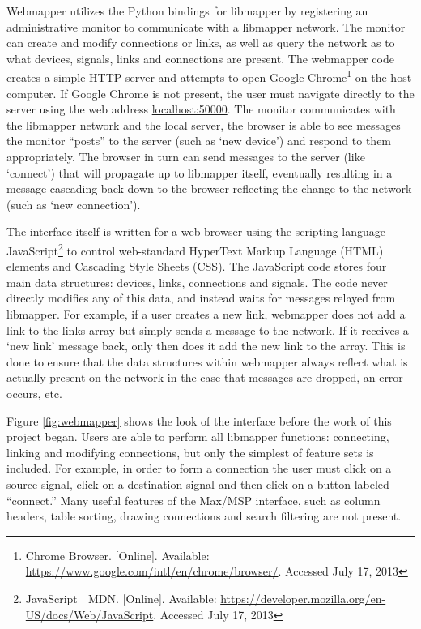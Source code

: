 Webmapper utilizes the Python bindings for libmapper by registering an administrative monitor to communicate with a libmapper network. The monitor can create and modify connections or links, as well as query the network as to what devices, signals, links and connections are present. The webmapper code creates a simple HTTP server and attempts to open Google Chrome\footnote{Chrome Browser. [Online]. Available: \url{https://www.google.com/intl/en/chrome/browser/}. Accessed July 17, 2013} on the host computer. If Google Chrome is not present, the user must navigate directly to the server using the web address \url{localhost:50000}. The monitor communicates with the libmapper network and the local server, the browser is able to see messages the monitor ``posts'' to the server (such as `new device') and respond to them appropriately. The browser in turn can send messages to the server (like `connect') that will propagate up to libmapper itself, eventually resulting in a message cascading back down to the browser reflecting the change to the network (such as `new connection'). 

The interface itself is written for a web browser using the scripting language JavaScript\footnote{JavaScript | MDN. [Online]. Available: \url{https://developer.mozilla.org/en-US/docs/Web/JavaScript}. Accessed July 17, 2013} to control web-standard HyperText Markup Language (HTML) elements and Cascading Style Sheets (CSS). The JavaScript code stores four main data structures: devices, links, connections and signals. The code never directly modifies any of this data, and instead waits for messages relayed from libmapper. For example, if a user creates a new link, webmapper does not add a link to the links array but simply sends a message to the network. If it receives a `new link' message back, only then does it add the new link to the array. This is done to ensure that the data structures within webmapper always reflect what is actually present on the network in the case that messages are dropped, an error occurs, etc.

Figure \ref{fig:webmapper} shows the look of the interface before the work of this project began. Users are able to perform all libmapper functions: connecting, linking and modifying connections, but only the simplest of feature sets is included. For example, in order to form a connection the user must click on a source signal, click on a destination signal and then click on a button labeled ``connect.'' Many useful features of the Max/MSP interface, such as column headers, table sorting, drawing connections and search filtering are not present.

